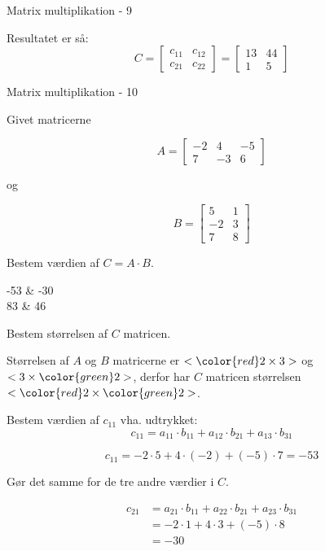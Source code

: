 \documentclass{article}
\begin{document}
\begin{exercise}{Matrix multiplikation - 9}
	
	\hint
	Resultatet er så:
	\[
	C = \left[\begin{array}{rr}
	c_{11} & c_{12} \\
	c_{21} & c_{22} 
	\end{array} \right] = 
	\left[\begin{array}{rr}
	13 & 44 \\
	1 & 5 
	\end{array} \right]
	\]
	
	
\end{exercise}

\newpage

\begin{exercise}{Matrix multiplikation - 10}
	
	Givet matricerne 
	
	\[
	A = \left[\begin{array}{rrr}
	-2 & 4 & -5 \\ 
	7 & -3 & 6
	\end{array} \right]
	\]
	
	og 
	
	\[
	B = \left[\begin{array}{rr}
	5 & 1 \\ 
	-2 & 3 \\
	7 & 8 
	\end{array} \right]
	\]
	
	Bestem værdien af $C = A \cdot B$.
	
	\begin{answermatrix}
		-53 & -30  \\
		83 & 46 
	\end{answermatrix}
	
	\hint
	Bestem størrelsen af $C$ matricen.
	
	\hint
	Størrelsen af $A$ og $B$ matricerne er $<{\color{red} 2} \times 3>$ og $<3 \times {\color{green}2}>$, 
	derfor har $C$ matricen størrelsen $<{\color{red} 2} \times {\color{green}2}>$.
	
	\hint
	Bestem værdien af $c_{11}$ vha. udtrykket:
	\[
	c_{11} = a_{11} \cdot b_{11} + a_{12} \cdot b_{21} + a_{13} \cdot b_{31}
	\]
	
	\hint
	\[
	c_{11} = -2 \cdot 5 + 4 \cdot (-2) + (-5) \cdot 7 = -53
	\]
	
	\hint
	Gør det samme for de tre andre værdier i $C$.
	
	\hint
	\begin{align*}
		c_{21} & = a_{21} \cdot b_{11} + a_{22} \cdot b_{21} + a_{23} \cdot b_{31}   \\
		& = -2 \cdot 1 + 4 \cdot 3 + (-5) \cdot 8 \\
		& = -30
	\end{align*}
	

\end{exercise}
\end{document}
